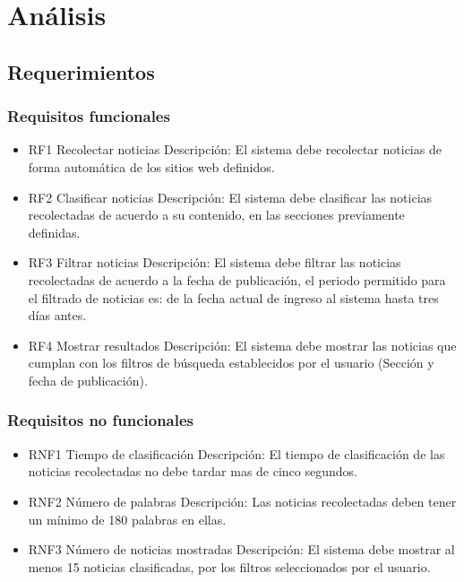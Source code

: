 \chapter{Análisis}

\section{Requerimientos}

\subsection{Requisitos funcionales}

\begin{itemize}

	\item RF1 Recolectar noticias
	Descripción: El sistema debe recolectar noticias de forma automática
	de los sitios web definidos.

	\item RF2 Clasificar noticias
	Descripción: El sistema debe clasificar las noticias recolectadas de
	acuerdo a su contenido, en las secciones previamente definidas.

	\item RF3 Filtrar noticias
	Descripción: El sistema debe filtrar las noticias recolectadas de acuerdo
	a la fecha de publicación, el periodo permitido para el filtrado de
	noticias es: de la fecha actual de ingreso al sistema hasta tres días antes.

	\item RF4 Mostrar resultados
	Descripción: El sistema debe mostrar las noticias que cumplan con
	los filtros de búsqueda establecidos por el usuario (Sección y fecha de
	publicación).

\end{itemize}

\subsection{Requisitos no funcionales}

\begin{itemize}

	\item RNF1 Tiempo de clasificación
	Descripción: El tiempo de clasificación de las noticias recolectadas no
	debe tardar mas de cinco segundos.

	\item RNF2 Número de palabras
	Descripción: Las noticias recolectadas deben tener un mínimo de 180
	palabras en ellas.

	\item RNF3 Número de noticias mostradas
	Descripción: El sistema debe mostrar al menos 15 noticias clasificadas,
	por los filtros seleccionados por el usuario.

\end{itemize}



